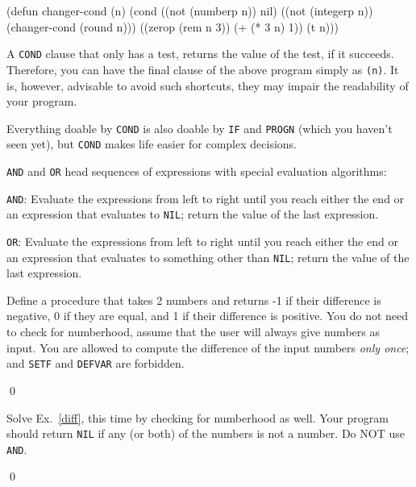 \documentclass[a4paper,11pt]{article}
\begin{document}
\begin{uenum}
\begin{lispcode}
(defun changer-cond (n)
  (cond ((not (numberp n)) nil)
        ((not (integerp n)) (changer-cond (round n)))
        ((zerop (rem n 3)) (+ (* 3 n) 1))
        (t n)))
\end{lispcode}

\item A \Verb+COND+ clause that only has a test, returns the value of the test, if it succeeds. Therefore, you can have the final clause of the above program simply as \Verb+(n)+. It is, however, advisable to avoid such shortcuts, they may impair the readability of your program. 

\item Everything doable by \Verb+COND+ is also doable by \Verb+IF+ and \Verb+PROGN+ (which you haven't seen yet), but \Verb+COND+ makes life easier for complex decisions.  

\item \Verb+AND+ and \Verb+OR+ head sequences of expressions with special evaluation algorithms:
\begin{uenumi}
\item \Verb+AND+: Evaluate the expressions from left to right until you reach either the end or an expression that evaluates to \Verb+NIL+; return the value of the last expression.
\item \Verb+OR+: Evaluate the expressions from left to right until you reach either the end or an expression that evaluates to something other than \Verb+NIL+; return the value of the last expression.
\end{uenumi}

\end{uenum}


\noindent\hrulefill

\begin{uexercise}
\label{diff}
Define a procedure that takes 2 numbers and returns -1 if their difference is negative, 0 if they are equal, and 1 if their difference is positive. You do not need to check for numberhood, assume that the user will always give numbers as input. You are allowed to compute the difference of the input numbers \emph{only once}; and \Verb+SETF+ and \Verb+DEFVAR+ are forbidden.

\qed
\end{uexercise}

\begin{uexercise}
Solve Ex.~\ref{diff}, this time by checking for numberhood as well. Your program should return \Verb+NIL+ if any (or both) of the numbers is not a number. Do NOT use \Verb+AND+. 

\qed
\end{uexercise}
\end{document}
